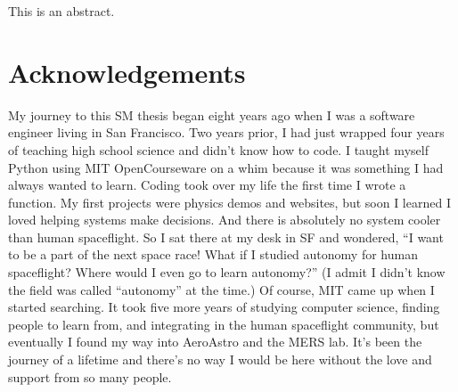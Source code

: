 \documentclass[10pt,leftblank,twoside]{mitthesis}
\begin{document}


\cleardoublepage
\setcounter{savepage}{\thepage}
\begin{abstractpage}

This is an abstract.

\end{abstractpage}

\cleardoublepage

\section*{Acknowledgements}

My journey to this SM thesis began eight years ago when I was a software engineer living in San
Francisco. Two years prior, I had just wrapped four years of teaching high school science and didn't
know how to code. I taught myself Python using MIT OpenCourseware on a whim because it was something
I had always wanted to learn. Coding took over my life the first time I wrote a function. My first
projects were physics demos and websites, but soon I learned I loved helping systems make decisions.
And there is absolutely no system cooler than human spaceflight. So I sat there at my desk in SF and
wondered, ``I want to be a part of the next space race! What if I studied autonomy for human
spaceflight? Where would I even go to learn autonomy?'' (I admit I didn't know the field was called
``autonomy'' at the time.) Of course, MIT came up when I started searching. It took five more years of
studying computer science, finding people to learn from, and integrating in the human spaceflight
community, but eventually I found my way into AeroAstro and the MERS lab. It's been the journey of a
lifetime and there's no way I would be here without the love and support from so many people.
\end{document}
